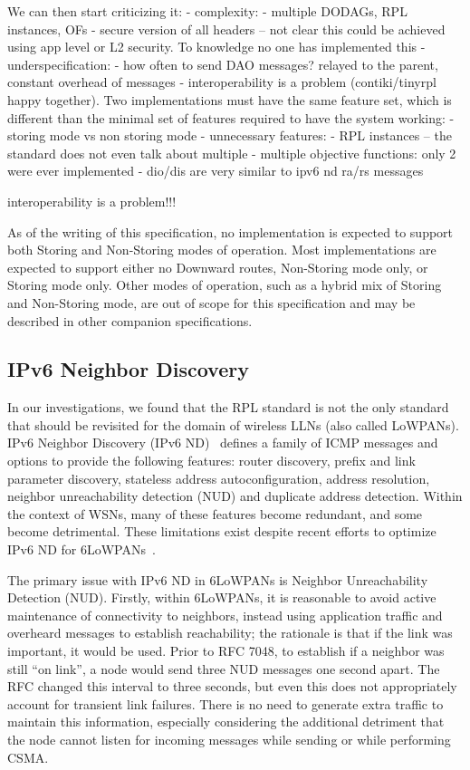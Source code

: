 We can then start criticizing it:
- complexity:
  - multiple DODAGs, RPL instances, OFs
  - secure version of all headers -- not clear this could be achieved using app level
    or L2 security. To knowledge no one has implemented this
- underspecification:
  - how often to send DAO messages? relayed to the parent, constant overhead of messages
  - interoperability is a problem (contiki/tinyrpl happy together). Two implementations
    must have the same feature set, which is different than the minimal set of features
    required to have the system working:
    - storing mode vs non storing mode
- unnecessary features:
  - RPL instances -- the standard does not even talk about multiple
  - multiple objective functions: only 2 were ever implemented
  - dio/dis are very similar to ipv6 nd ra/rs messages
\fi


interoperability is a problem!!!

As of the writing of this specification, no implementation is
expected to support both Storing and Non-Storing modes of operation.
Most implementations are expected to support either no Downward
routes, Non-Storing mode only, or Storing mode only.  Other modes of
operation, such as a hybrid mix of Storing and Non-Storing mode, are
out of scope for this specification and may be described in other
companion specifications.
\fi

\subsection{IPv6 Neighbor Discovery}

In our investigations, we found that the RPL standard is not the only standard that should be revisited for the domain of wireless LLNs (also called LoWPANs).
IPv6 Neighbor Discovery (IPv6 ND)~\cite{narten2007rfc4861} defines a family of ICMP messages and options to provide the following features: router discovery, prefix and link parameter discovery, stateless address autoconfiguration, address resolution, neighbor unreachability detection (NUD) and duplicate address detection.
Within the context of WSNs, many of these features become redundant, and some become detrimental.
These limitations exist despite recent efforts to optimize IPv6 ND for 6LoWPANs~\cite{shelby2012rfc}.

The primary issue with IPv6 ND in 6LoWPANs is Neighbor Unreachability Detection (NUD).
Firstly, within 6LoWPANs, it is reasonable to avoid active maintenance of connectivity to neighbors, instead using application traffic and overheard messages to establish reachability; the rationale is that if the link was important, it would be used.
Prior to RFC 7048, to establish if a neighbor was still ``on link'', a node would send three NUD messages one second apart.
The RFC changed this interval to three seconds, but even this does not appropriately account for transient link failures.
There is no need to generate extra traffic to maintain this information, especially considering the additional detriment that the node cannot listen for incoming messages while sending or while performing CSMA.

